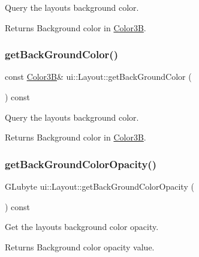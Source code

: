 Query the layout\textquotesingle{}s background color. \begin{DoxyReturn}{Returns}
Background color in \hyperlink{structColor3B}{Color3B}. 
\end{DoxyReturn}
\mbox{\label{classui_1_1Layout_a2a62061703514408f935daf7bf89af57}} 
\subsubsection{\texorpdfstring{get\+Back\+Ground\+Color()}{getBackGroundColor()}\hspace{0.1cm}{\footnotesize\ttfamily [2/2]}}
{\footnotesize\ttfamily const \hyperlink{structColor3B}{Color3B}\& ui\+::\+Layout\+::get\+Back\+Ground\+Color (\begin{DoxyParamCaption}{ }\end{DoxyParamCaption}) const}

Query the layout\textquotesingle{}s background color. \begin{DoxyReturn}{Returns}
Background color in \hyperlink{structColor3B}{Color3B}. 
\end{DoxyReturn}
\mbox{\label{classui_1_1Layout_a1635ca93fd35f356f5998a7f6d27ae16}} 
\subsubsection{\texorpdfstring{get\+Back\+Ground\+Color\+Opacity()}{getBackGroundColorOpacity()}\hspace{0.1cm}{\footnotesize\ttfamily [1/2]}}
{\footnotesize\ttfamily G\+Lubyte ui\+::\+Layout\+::get\+Back\+Ground\+Color\+Opacity (\begin{DoxyParamCaption}{ }\end{DoxyParamCaption}) const}

Get the layout\textquotesingle{}s background color opacity. \begin{DoxyReturn}{Returns}
Background color opacity value. 
\end{DoxyReturn}
\mbox{\label{classui_1_1Layout_a1635ca93fd35f356f5998a7f6d27ae16}} 
